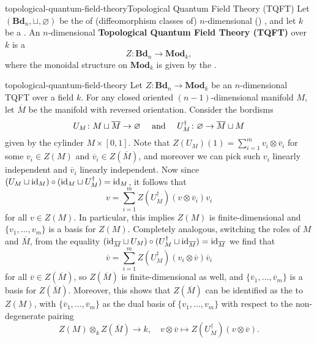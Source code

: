 \begin{topic}{topological-quantum-field-theory}{Topological Quantum Field Theory (TQFT)}
    Let $(\textbf{Bd}_n, \sqcup, \varnothing)$ be the  of (diffeomorphism classes of) $n$-dimensional () , and let $k$ be a . An $n$-dimensional \textbf{Topological Quantum Field Theory (TQFT)} over $k$ is a 
    \[ Z \colon \textbf{Bd}_n \to \textbf{Mod}_k , \]
    where the monoidal structure on $\textbf{Mod}_k$ is given by the .
\end{topic}


\begin{example}{topological-quantum-field-theory}
    Let $Z \colon \textbf{Bd}_n \to \textbf{Mod}_k$ be an $n$-dimensional TQFT over a field $k$. For any closed oriented $(n - 1)$-dimensional manifold $M$, let $\overline{M}$ be the manifold with reversed orientation. Consider the bordisms
    \[ U_M \colon M \sqcup \overline{M} \to \varnothing \quad \textup{ and } \quad U_M^\dag \colon \varnothing \to \overline{M} \sqcup M \]
    given by the cylinder $M \times [0, 1]$.
    Note that $Z(U_M)(1) = \sum_{i = 1}^{m} v_i \otimes \overline{v}_i$ for some $v_i \in Z(M)$ and $\overline{v}_i \in Z(\overline{M})$, and moreover we can pick such $v_i$ linearly independent and $\overline{v}_i$ linearly independent.
    Now since $(U_M \sqcup \textup{id}_M) \circ (\textup{id}_M \sqcup U_M^\dag) = \textup{id}_M$, it follows that
    \[ v = \sum_{i = 1}^{m} Z(U_M^\dag)(v \otimes \overline{v}_i) v_i \]
    for all $v \in Z(M)$. In particular, this implies $Z(M)$ is finite-dimensional and $\{ v_1, \ldots, v_m \}$ is a basis for $Z(M)$.
    Completely analogous, switching the roles of $M$ and $\overline{M}$, from the equality $(\textup{id}_{\overline{M}} \sqcup U_M) \circ (U_M^\dag \sqcup \textup{id}_{\overline{M}}) = \textup{id}_{\overline{M}}$ we find that
    \[ \overline{v} = \sum_{i = 1}^{m} Z(U_M^\dag)(v_i \otimes \overline{v}) \overline{v}_i \]
    for all $\overline{v} \in Z(\overline{M})$, so $Z(\overline{M})$ is finite-dimensional as well, and $\{ \overline{v}_1, \ldots, \overline{v}_m \}$ is a basis for $Z(\overline{M})$. Moreover, this shows that $Z(\overline{M})$ can be identified as the  to $Z(M)$, with $\{ \overline{v}_1, \ldots, \overline{v}_m \}$ as the dual basis of $\{ v_1, \ldots, v_m \}$ with respect to the non-degenerate pairing
    \[ Z(M) \otimes_k Z(\overline{M}) \to k, \quad v \otimes \overline{v} \mapsto Z(U_M^\dagger)(v \otimes \overline{v}) . \]
\end{example}


